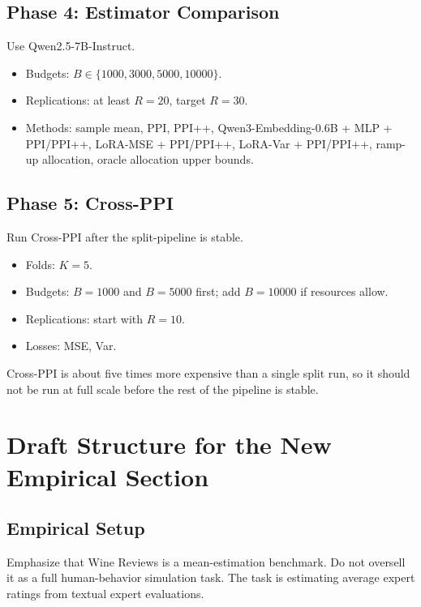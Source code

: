 \documentclass[11pt]{article}
\begin{document}
\subsection{Phase 4: Estimator Comparison}

Use Qwen2.5-7B-Instruct.

\begin{itemize}
    \item Budgets: $B\in\{1000,3000,5000,10000\}$.
    \item Replications: at least $R=20$, target $R=30$.
    \item Methods: sample mean, PPI, PPI++, Qwen3-Embedding-0.6B + MLP + PPI/PPI++, LoRA-MSE + PPI/PPI++, LoRA-Var + PPI/PPI++, ramp-up allocation, oracle allocation upper bounds.
\end{itemize}

\subsection{Phase 5: Cross-PPI}

Run Cross-PPI after the split-pipeline is stable.

\begin{itemize}
    \item Folds: $K=5$.
    \item Budgets: $B=1000$ and $B=5000$ first; add $B=10000$ if resources allow.
    \item Replications: start with $R=10$.
    \item Losses: MSE, Var.
\end{itemize}

Cross-PPI is about five times more expensive than a single split run, so it should not be run at full scale before the rest of the pipeline is stable.

\section{Draft Structure for the New Empirical Section}

\subsection{Empirical Setup}

Emphasize that Wine Reviews is a mean-estimation benchmark. Do not oversell it as a full human-behavior simulation task. The task is estimating average expert ratings from textual expert evaluations.
\end{document}
